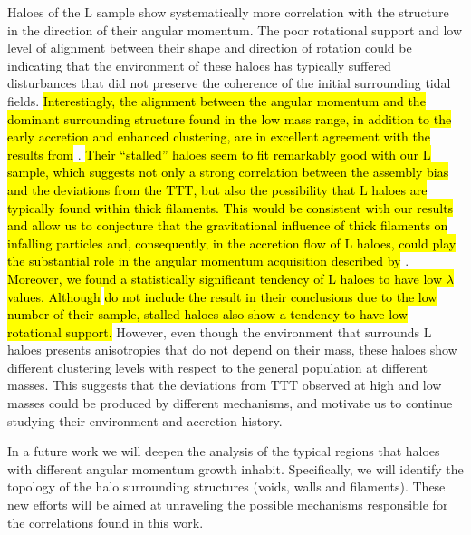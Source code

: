 \documentclass[fleqn,usenatbib]{mnras}
\newcommand{\Lh}{\mathrm{L}}
\begin{document}
Haloes of the $\Lh$ sample show systematically more correlation with the structure in the direction of their angular momentum. The poor rotational support and low level of alignment between their shape and direction of rotation could be indicating that the environment of these haloes has typically suffered disturbances that did not preserve the coherence of the initial surrounding tidal fields. \hl{Interestingly, the alignment between the angular momentum and the dominant surrounding structure found in the low mass range, in addition to the early accretion and enhanced clustering, are in excellent agreement with the results from} \citet{borzyszkowskietal2017}. \hl{Their ``stalled'' haloes seem to fit remarkably good with our $\Lh$ sample, which suggests not only a strong correlation between the assembly bias and the deviations from the TTT, but also the possibility that $\Lh$ haloes are typically found within thick filaments. This would be consistent with our results and allow us to conjecture that the gravitational influence of thick filaments on infalling particles and, consequently, in the accretion flow of $\Lh$ haloes, could play the substantial role in the angular momentum acquisition described by} \citeauthor{borzyszkowskietal2017}. \hl{Moreover, we found a statistically significant tendency of $\Lh$ haloes to have low $\lambda$ values. Although }\citeauthor{borzyszkowskietal2017}\hl{ do not include the result in their conclusions due to the low number of their sample, stalled haloes also show a tendency to have low rotational support.}
However, even though the environment that surrounds $\Lh$ haloes presents anisotropies that do not depend on their mass, these haloes show different clustering levels with respect to the general population at different masses. This suggests that the deviations from TTT observed at high and low masses could be produced by different mechanisms, and motivate us to continue studying their environment and accretion history.

In a future work we will deepen the analysis of the typical regions that haloes with different angular momentum growth inhabit. Specifically, we will identify the topology of the halo surrounding structures (voids, walls and filaments). These new efforts will be aimed at unraveling the possible mechanisms responsible for the correlations found in this work.

\end{document}
